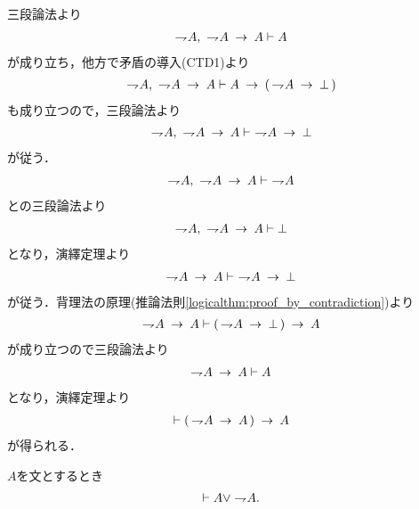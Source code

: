 	\begin{sketch}
		三段論法より
		\begin{align}
			\negation A,\ \negation A \rarrow A \vdash A
		\end{align}
		が成り立ち，他方で矛盾の導入(CTD1)より
		\begin{align}
			\negation A,\ \negation A \rarrow A
			\vdash A \rarrow (\, \negation A \rarrow \bot\, )
		\end{align}
		も成り立つので，三段論法より
		\begin{align}
			\negation A,\ \negation A \rarrow A \vdash\ \negation A \rarrow \bot
		\end{align}
		が従う．
		\begin{align}
			\negation A,\ \negation A \rarrow A \vdash\ \negation A
		\end{align}
		との三段論法より
		\begin{align}
			\negation A,\ \negation A \rarrow A \vdash \bot
		\end{align}
		となり，演繹定理より
		\begin{align}
			\negation A \rarrow A \vdash\ \negation A \rarrow \bot
		\end{align}
		が従う．背理法の原理(推論法則\ref{logicalthm:proof_by_contradiction})より
		\begin{align}
			\negation A \rarrow A \vdash (\, \negation A \rarrow \bot\, )
			\rarrow A
		\end{align}
		が成り立つので三段論法より
		\begin{align}
			\negation A \rarrow A \vdash A
		\end{align}
		となり，演繹定理より
		\begin{align}
			\vdash (\, \negation A \rarrow A\, ) \rarrow A
		\end{align}
		が得られる．
		\QED
	\end{sketch}
	
	\begin{screen}
		\begin{logicalthm}[排中律]\label{logicalthm:law_of_excluded_middle}
			$A$を文とするとき
			\begin{align}
				\vdash A \vee \negation A.
			\end{align}
		\end{logicalthm}
	\end{screen}
	
